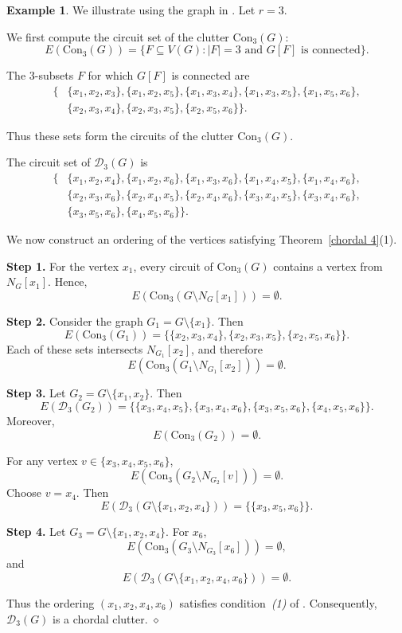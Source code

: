 \documentclass[12pt,reqno]{amsart}
\theoremstyle{definition}
\newtheorem{example}[proposition]{Example}
\newcommand{\Con}{{\mathrm{Con}}}
\def\D{\mathcal{D}}
\begin{document}
\medskip
\begin{example}
We illustrate  using the graph in .
Let $r=3$.

We first compute the circuit set of the clutter $\Con_3(G)$:
\[
E(\Con_3(G))
=
\{ F \subseteq V(G) : |F|=3 \text{ and } G[F] \text{ is connected} \}.
\]

The $3$-subsets $F$ for which $G[F]$ is connected are
\[
\begin{aligned}
\{
&\{x_1,x_2,x_3\},\{x_1,x_2,x_5\},\{x_1,x_3,x_4\},\{x_1,x_3,x_5\},\{x_1,x_5,x_6\},\\
&\{x_2,x_3,x_4\},\{x_2,x_3,x_5\},\{x_2,x_5,x_6\}
\}.
\end{aligned}
\]

Thus these sets form the circuits of the clutter $\Con_3(G)$.

The circuit set of $\D_3(G)$ is
\begin{align*}
\{
&\{x_1,x_2,x_4\},\{x_1,x_2,x_6\},\{x_1,x_3,x_6\},\{x_1,x_4,x_5\},\{x_1,x_4,x_6\},\\
&\{x_2,x_3,x_6\},\{x_2,x_4,x_5\},\{x_2,x_4,x_6\},\{x_3,x_4,x_5\},\{x_3,x_4,x_6\},\\
&\{x_3,x_5,x_6\},\{x_4,x_5,x_6\}
\}.
\end{align*}

We now construct an ordering of the vertices satisfying
Theorem~\ref{chordal 4}(1).

\medskip
\noindent
\textbf{Step 1.}
For the vertex $x_1$, every circuit of $\Con_3(G)$ contains a vertex from $N_G[x_1]$.
Hence,
\[
E(\Con_3(G \setminus N_G[x_1])) = \emptyset.
\]

\medskip
\noindent
\textbf{Step 2.}
Consider the graph $G_1 = G \setminus \{x_1\}$. Then
\[
E(\Con_3(G_1))
=
\{\{x_2,x_3,x_4\},\{x_2,x_3,x_5\},\{x_2,x_5,x_6\}\}.
\]
Each of these sets intersects $N_{G_1}[x_2]$, and therefore
\[
E(\Con_3(G_1 \setminus N_{G_1}[x_2]))=\emptyset.
\]

\medskip
\noindent
\textbf{Step 3.}
Let $G_2 = G \setminus \{x_1,x_2\}$. Then
\[
E(\D_3(G_2))
=
\{\{x_3,x_4,x_5\},\{x_3,x_4,x_6\},\{x_3,x_5,x_6\},\{x_4,x_5,x_6\}\}.
\]
Moreover,
\[
E(\Con_3(G_2))=\emptyset.
\]

For any vertex $v \in \{x_3,x_4,x_5,x_6\}$,
\[
E(\Con_3(G_2 \setminus N_{G_2}[v]))=\emptyset.
\]
Choose $v=x_4$. Then
\[
E(\D_3(G\setminus\{x_1,x_2,x_4\}))=\{\{x_3,x_5,x_6\}\}.
\]

\medskip
\noindent
\textbf{Step 4.}
Let $G_3 = G\setminus\{x_1,x_2,x_4\}$. For $x_6$,
\[
E(\Con_3(G_3 \setminus N_{G_3}[x_6]))=\emptyset,
\]
and
\[
E(\D_3(G\setminus\{x_1,x_2,x_4,x_6\}))=\emptyset.
\]

Thus the ordering $(x_1,x_2,x_4,x_6)$ satisfies condition~\emph{(1)} of
. Consequently, $\D_3(G)$ is a chordal clutter.
\hfill$\diamond$
\end{example}
\end{document}
